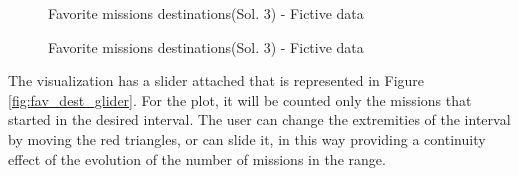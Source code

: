 \documentclass{article}
\begin{document}
\begin{figure}[H]
	\centering
	\caption{Favorite missions destinations(Sol. 3) - Fictive data}
	\label{fig:fav_dest_world}
\end{figure}

\begin{figure}[H]
	\centering
	\caption{Favorite missions destinations(Sol. 3) - Fictive data}
	\label{fig:fav_dest_europe}
\end{figure}

The visualization has a slider attached that is represented in Figure \ref{fig:fav_dest_glider}. For the plot, it will be counted only the missions that started in the desired interval. The user can change the extremities of the interval by moving the red triangles, or can slide it, in this way providing a continuity effect of the evolution of the number of missions in the range.\\
\end{document}
